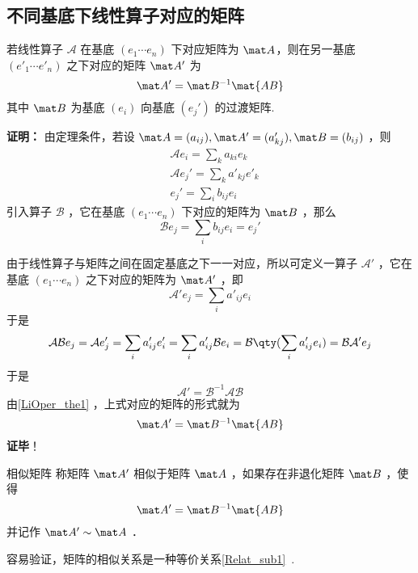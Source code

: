 \subsection{不同基底下线性算子对应的矩阵}\label{LiOper_sub1}
\begin{theorem}{}\label{LiOper_the2}
若线性算子 $\mathcal A$ 在基底 $( e_1\cdots  e_n)$ 下对应矩阵为 $\mat A$，则在另一基底  $( e'_1\cdots  e'_n)$ 之下对应的矩阵 $\mat A'$ 为
\begin{equation}
\mat A'=\mat B^{-1}\mat{AB}
\end{equation}
其中 $\mat B$ 为基底 $( e_i)$ 向基底 $( e_j')$ 的过渡矩阵.
\end{theorem}
\textbf{证明：}
由定理条件，若设 $\mat A=(a_{ij}), \mat A'=(a_{kj}'),\mat B=(b_{ij})$ ，则
\begin{equation}
\begin{aligned}
&\mathcal{A} e_i=\sum_{k} a_{ki} e_k
\\
&\mathcal{A} e_j'=\sum_{k} a'_{kj} e'_k\\
& e_j'=\sum_i b_{ij} e_i
\end{aligned}
\end{equation}
引入算子 $\mathcal{B}$ ，它在基底 $( e_1\cdots  e_n)$ 下对应的矩阵为 $\mat B$ ，那么
\begin{equation}
\mathcal{B} e_j=\sum_i b_{ij} e_i= e_j'
\end{equation}

由于线性算子与矩阵之间在固定基底之下一一对应，所以可定义一算子 $\mathcal{A'}$ ，它在基底 $( e_1\cdots  e_n)$ 之下对应的矩阵为 $\mat A'$ ，即
\begin{equation}
\mathcal A' e_j=\sum_i a'_{ij} e_i
\end{equation}
于是
\begin{equation}
\mathcal{AB} e_j=\mathcal{A} e'_j=\sum_i a'_{ij}  e'_i=\sum_i a'_{ij}\mathcal{B} e_i=\mathcal{B}\qty(\sum_i a'_{ij} e_i)=\mathcal{BA'} e_j
\end{equation}
于是 
\begin{equation}
\mathcal{A'}=\mathcal{B}^{-1}\mathcal{AB}
\end{equation}
由\autoref{LiOper_the1} ，上式对应的矩阵的形式就为
\begin{equation}
\mat A'=\mat B^{-1}\mat{AB}
\end{equation}
\textbf{证毕}！
\begin{definition}{相似矩阵}
称矩阵 $\mat A'$ 相似于矩阵 $\mat A$ ，如果存在非退化矩阵 $\mat B$ ，使得
\begin{equation}
\mat A'=\mat B^{-1}\mat{AB}
\end{equation}
并记作 $\mat A'\sim \mat A$ ．
\end{definition}
容易验证，矩阵的相似关系是一种等价关系\autoref{Relat_sub1}~.

